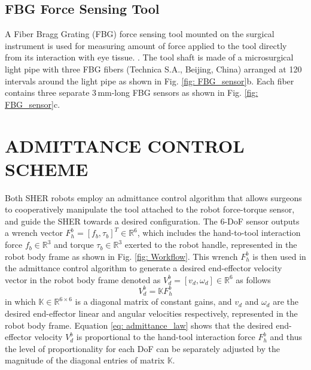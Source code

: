 \documentclass[letterpaper, 10 pt, conference]{ieeeconf}  %
\begin{document}
\subsection{FBG Force Sensing Tool}

A Fiber Bragg Grating (FBG) force sensing tool mounted on the surgical instrument is used for measuring amount of force applied to the tool directly from its interaction with eye tissue. \cite{he2020automatic}.
The tool shaft is made of a microsurgical light pipe with three FBG fibers (Technica S.A., Beijing, China) arranged at 120\textdegree{} intervals around the light pipe as shown in Fig. \ref{fig: FBG_sensor}b. Each fiber contains three separate 3\,mm-long FBG sensors as shown in Fig. \ref{fig: FBG_sensor}c.

\section{ADMITTANCE CONTROL SCHEME}





Both SHER robots employ an admittance control algorithm that allows surgeons to cooperatively manipulate the tool attached to the robot force-torque sensor, and guide the SHER towards a desired configuration. The 6-DoF sensor outputs a wrench vector $F_h^b =[f_b,\tau_b]^T\in \mathbb{R}^6$, which includes the hand-to-tool interaction force $f_b\in \mathbb{R}^3$ and torque $\tau_b \in \mathbb{R}^3$ exerted to the robot handle, represented in the robot body frame as shown in Fig. \ref{fig: Workflow}. This wrench $F_h^b$ is then used in the admittance control algorithm to generate a desired end-effector velocity vector in the robot body frame denoted as $V_d^b = [v_d , \omega_d]\in \mathbb{R}^6$ as follows
\begin{equation} %
V_d^b = \mathbb{K} F_h^b 
\label{eq: admittance_law}
\end{equation}
in which $\mathbb{K}\in \mathbb{R}^{6 \times 6}$ is a diagonal matrix of constant gains, and $v_d$ and $\omega_d$ are the desired end-effector linear and angular velocities respectively, represented in the robot body frame. Equation \ref{eq: admittance_law} shows that the desired end-effector velocity $V_d^b$ is proportional to the hand-tool interaction force $F_h^b$ %
and thus the level of proportionality for each DoF can be separately adjusted by the magnitude of the diagonal entries of matrix $\mathbb{K}$.   
\end{document}
